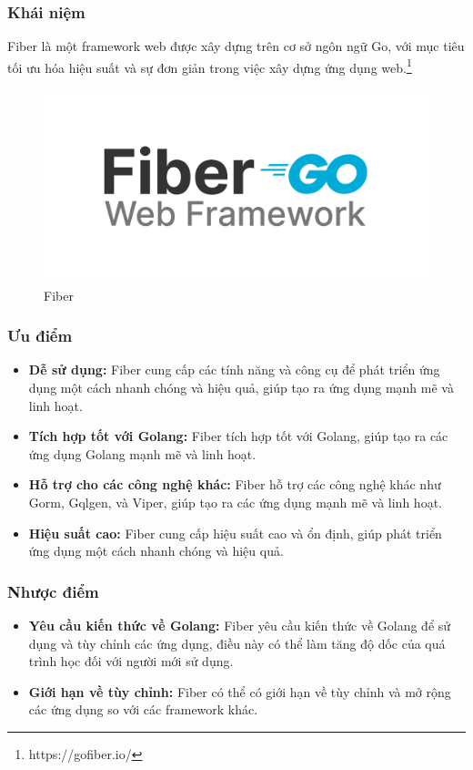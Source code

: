 \subsubsection{Khái niệm}
\noindent Fiber là một framework web được xây dựng trên cơ sở ngôn ngữ Go, với mục tiêu tối ưu hóa hiệu suất và sự đơn giản trong việc xây dựng ứng dụng web.\footnote{https://gofiber.io/}
\begin{figure}[H]
  \begin{center}
    \includegraphics[scale=0.25]{images/hieu/phuluc/fiber.png}
    \caption{Fiber}
  \end{center}
\end{figure}
\subsubsection{Ưu điểm}
\begin{itemize}
  \item \textbf{Dễ sử dụng:} Fiber cung cấp các tính năng và công cụ để phát triển ứng dụng một cách nhanh chóng và hiệu quả, giúp tạo ra ứng dụng mạnh mẽ và linh hoạt.
  \item \textbf{Tích hợp tốt với Golang:} Fiber tích hợp tốt với Golang, giúp tạo ra các ứng dụng Golang mạnh mẽ và linh hoạt.
  \item \textbf{Hỗ trợ cho các công nghệ khác:} Fiber hỗ trợ các công nghệ khác như Gorm, Gqlgen, và Viper, giúp tạo ra các ứng dụng mạnh mẽ và linh hoạt.
  \item \textbf{Hiệu suất cao:} Fiber cung cấp hiệu suất cao và ổn định, giúp phát triển ứng dụng một cách nhanh chóng và hiệu quả.
\end{itemize}
\subsubsection{Nhược điểm}
\begin{itemize}
  \item \textbf{Yêu cầu kiến thức về Golang:} Fiber yêu cầu kiến thức về Golang để sử dụng và tùy chỉnh các ứng dụng, điều này có thể làm tăng độ dốc của quá trình học đối với người mới sử dụng.
  \item \textbf{Giới hạn về tùy chỉnh:} Fiber có thể có giới hạn về tùy chỉnh và mở rộng các ứng dụng so với các framework khác.
\end{itemize}
